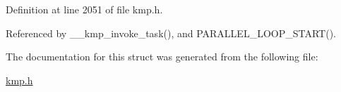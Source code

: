 Definition at line 2051 of file kmp.\-h.



Referenced by \-\_\-\-\_\-kmp\-\_\-invoke\-\_\-task(), and P\-A\-R\-A\-L\-L\-E\-L\-\_\-\-L\-O\-O\-P\-\_\-\-S\-T\-A\-R\-T().



The documentation for this struct was generated from the following file\-:\begin{DoxyCompactItemize}
\item 
\hyperlink{kmp_8h}{kmp.\-h}\end{DoxyCompactItemize}
